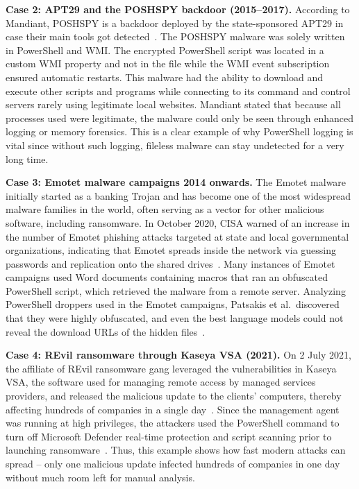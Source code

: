 \documentclass[12pt,a4paper]{article}
\newcommand{\head}[1]{\noindent\textbf{#1}\quad}
\begin{document}
\head{Case 2: APT29 and the POSHSPY backdoor (2015--2017).} According to Mandiant, POSHSPY is a backdoor deployed by the state-sponsored APT29 in case their main tools got detected~\cite{dunwoody2017}. The POSHSPY malware was solely written in PowerShell and WMI. The encrypted PowerShell script was located in a custom WMI property and not in the file while the WMI event subscription ensured automatic restarts. This malware had the ability to download and execute other scripts and programs while connecting to its command and control servers rarely using legitimate local websites. Mandiant stated that because all processes used were legitimate, the malware could only be seen through enhanced logging or memory forensics. This is a clear example of why PowerShell logging is vital since without such logging, fileless malware can stay undetected for a very long time.

\head{Case 3: Emotet malware campaigns 2014 onwards.} The Emotet malware initially started as a banking Trojan and has become one of the most widespread malware families in the world, often serving as a vector for other malicious software, including ransomware. In October 2020, CISA warned of an increase in the number of Emotet phishing attacks targeted at state and local governmental organizations, indicating that Emotet spreads inside the network via guessing passwords and replication onto the shared drives~\cite{cisa2020emotet}. Many instances of Emotet campaigns used Word documents containing macros that ran an obfuscated PowerShell script, which retrieved the malware from a remote server. Analyzing PowerShell droppers used in the Emotet campaigns, Patsakis et al.\ discovered that they were highly obfuscated, and even the best language models could not reveal the download URLs of the hidden files~\cite{patsakis2024}.

\head{Case 4: REvil ransomware through Kaseya VSA (2021).} On 2 July 2021, the affiliate of REvil ransomware gang leveraged the vulnerabilities in Kaseya VSA, the software used for managing remote access by managed services providers, and released the malicious update to the clients' computers, thereby affecting hundreds of companies in a single day~\cite{sophos2021}. Since the management agent was running at high privileges, the attackers used the PowerShell command to turn off Microsoft Defender real-time protection and script scanning prior to launching ransomware~\cite{splunk2021}. Thus, this example shows how fast modern attacks can spread -- only one malicious update infected hundreds of companies in one day without much room left for manual analysis.
\end{document}
